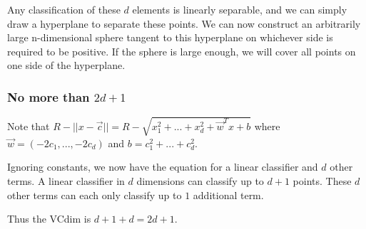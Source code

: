 \documentclass[]{article}
\begin{document}
Any classification of these $d$ elements is linearly separable, and we can simply draw a hyperplane to separate these points. We can now construct an arbitrarily large n-dimensional sphere tangent to this hyperplane on whichever side is required to be positive. If the sphere is large enough, we will cover all points on one side of the hyperplane.

\subsubsection{No more than $2d+1$}
Note that $R - ||x-\vec{c}|| = R - \sqrt{x_1^2 + ... + x_d^2 + \vec w^T x + b}$ where $\vec{w} = (-2c_1,...,-2c_d)$ and $b = c_1^2 + ... + c_d^2$.

Ignoring constants, we now have the equation for a linear classifier and $d$ other terms. A linear classifier in $d$ dimensions can classify up to $d+1$ points. These $d$ other terms can each only classify up to $1$ additional term.

Thus the VCdim is $d+1 + d = 2d+1$.
\end{document}
